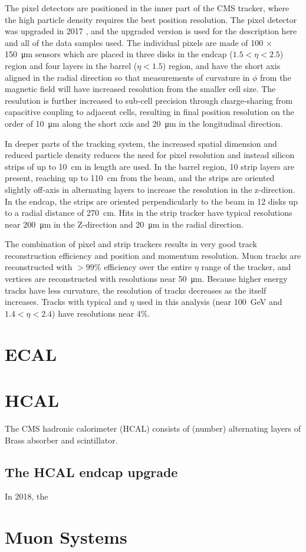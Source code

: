 The pixel detectors are positioned in the inner part of the CMS tracker, where the high particle density requires the best position resolution. 
The pixel detector was upgraded in 2017 \cite{pixelUpgrade}, and the upgraded version is used for the description here and all of the data samples used. 
The individual pixels are made of 100 $\times$ \SI{150}{\micro\meter} sensors which are placed in three disks in the endcap ($1.5<\eta<2.5$) region and four layers in the barrel ($\eta<1.5$) region, and have the short axis aligned in the radial direction so that measurements of curvature in $\phi$ from the magnetic field will have increased resolution from the smaller cell size. 
The resulution is further increased to sub-cell precision through charge-sharing from capacitive coupling to adjacent cells, resulting in final position resolution on the order of \SI{10}{\micro\meter} along the short axis and \SI{20}{\micro\meter} in the longitudinal direction.

In deeper parts of the tracking system, the increased spatial dimension and reduced particle density reduces the need for pixel resolution and instead silicon strips of up to \SI{10}{\centi\meter} in length are used. 
In the barrel region, 10 strip layers are present, reaching up to \SI{110}{\centi\meter} from the beam, and the strips are oriented slightly off-axis in alternating layers to increase the resolution in the z-direction. 
In the endcap, the strips are oriented perpendicularly to the beam in 12 disks up to a radial distance of \SI{270}{\centi\meter}.
Hits in the strip tracker have typical resolutions near \SI{200}{\micro\meter} in the Z-direction and \SI{20}{\micro\meter} in the radial direction.

The combination of pixel and strip trackers results in very good track reconstruction efficiency and position and momentum resolution.
Muon tracks are reconstructed with $>99\%$ efficiency over the entire $\eta$ range of the tracker, and vertices are reconstructed with resolutions near \SI{50}{\micro\meter}.
Because higher energy tracks have less curvature, the \pt resolution of tracks decreases as the \pt itself increases. Tracks with typical \pt and $\eta$ used in this analysis (\pt near \SI{100}{\giga\eV} and $1.4<\eta<2.4$) have resolutions near 4$\%$. 

\section{ECAL}

\section{HCAL}
The CMS hadronic calorimeter (HCAL) consists of (number) alternating layers of Brass absorber and scintillator. 

\subsection{The HCAL endcap upgrade}
In 2018, the 
\section{Muon Systems}